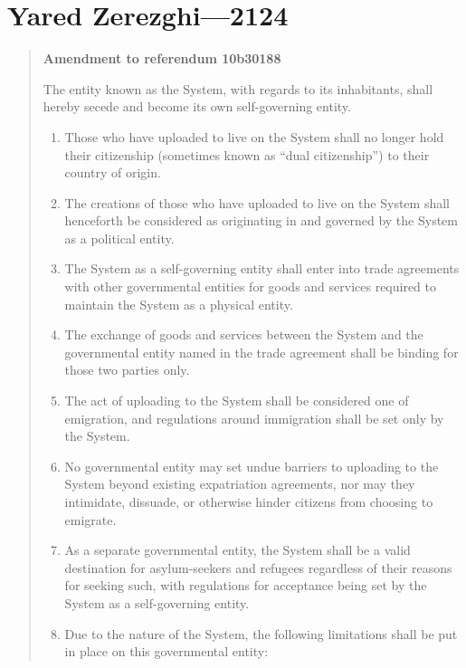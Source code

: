 \hypertarget{yared-zerezghi-2124}{%
\chapter{Yared Zerezghi—2124}\label{yared-zerezghi-2124}}

\begin{quote}
\textbf{Amendment to referendum 10b30188}

The entity known as the System, with regards to its inhabitants, shall hereby secede and become its own self-governing entity.

\begin{enumerate}
\def\labelenumi{\arabic{enumi}.}
\tightlist
\item
  Those who have uploaded to live on the System shall no longer hold their citizenship (sometimes known as ``dual citizenship'') to their country of origin.
\item
  The creations of those who have uploaded to live on the System shall henceforth be considered as originating in and governed by the System as a political entity.
\item
  The System as a self-governing entity shall enter into trade agreements with other governmental entities for goods and services required to maintain the System as a physical entity.
\item
  The exchange of goods and services between the System and the governmental entity named in the trade agreement shall be binding for those two parties only.
\item
  The act of uploading to the System shall be considered one of emigration, and regulations around immigration shall be set only by the System.
\item
  No governmental entity may set undue barriers to uploading to the System beyond existing expatriation agreements, nor may they intimidate, dissuade, or otherwise hinder citizens from choosing to emigrate.
\item
  As a separate governmental entity, the System shall be a valid destination for asylum-seekers and refugees regardless of their reasons for seeking such, with regulations for acceptance being set by the System as a self-governing entity.
\item
  Due to the nature of the System, the following limitations shall be put in place on this governmental entity:


\end{enumerate}
\end{quote}
